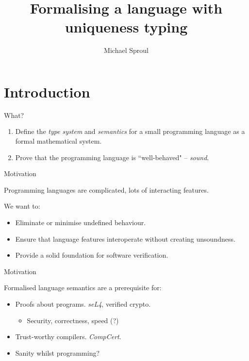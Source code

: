 \documentclass[10pt]{beamer}
\title{Formalising a language with uniqueness typing}
\author{Michael Sproul}
\date{}
\institute{
    Supervisor: Ben Lippmeier\\
    University of New South Wales
}
\begin{document}
\maketitle

\section{Introduction}

\begin{frame}{What?}

\begin{enumerate}
\item Define the \textit{type system} and \textit{semantics} for a small programming language as a formal mathematical system.
\item Prove that the programming language is ``well-behaved" -- \textit{sound}.
\end{enumerate}
\end{frame}

\begin{frame}
{Motivation}

Programming languages are complicated, lots of interacting features.

We want to:

\begin{itemize}
\item Eliminate or minimise undefined behaviour.

\item Ensure that language features interoperate without creating unsoundness.

\item Provide a solid foundation for software verification.

\end{itemize}
\end{frame}

\begin{frame}
{Motivation}

Formalised language semantics are a prerequisite for:

\begin{itemize}
\item Proofs about programs. \textit{seL4}, verified crypto.
    \begin{itemize}
    \item Security, correctness, speed (?)
    \end{itemize}
\item Trust-worthy compilers. \textit{CompCert}.
\item Sanity whilst programming?
\end{itemize}
\end{frame}
\end{document}
